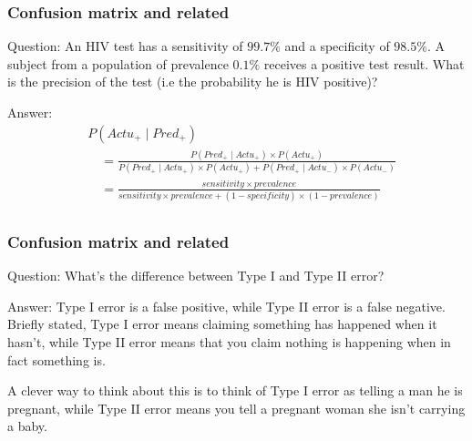 \documentclass[11pt]{beamer}
\begin{document}
\begin{frame}
\frametitle{Confusion matrix and related}
\begin{block}{Question:}
	An HIV test has a sensitivity of $99.7\%$ and a specificity of $98.5\%$. A subject from a population of prevalence $0.1\%$ receives a positive test result. What is the precision of the test (i.e the probability he is HIV positive)?
\end{block}
\begin{block}{Answer:}
	\begin{align*}
	&P(Actu_+\mid Pred_+)\\ &\quad= \frac{P( Pred_+\mid Actu_+)\times P(Actu_+)}{P( Pred_+\mid Actu_+)\times P(Actu_+) + P( Pred_+\mid Actu_-)\times P(Actu_-)}\\
	&\quad=\frac{sensitivity\times prevalence}{sensitivity\times prevalence + (1 - specificity)\times(1-prevalence)}\\
	\end{align*}
\end{block}
\end{frame}

\begin{frame}
\frametitle{Confusion matrix and related}
\begin{block}{Question:}
	What’s the difference between Type I and Type II error?
\end{block}
\begin{block}{Answer:}
	Type I error is a false positive, while Type II error is a false negative. Briefly stated, Type I error means claiming something has happened when it hasn’t, while Type II error means that you claim nothing is happening when in fact something is.
	
	A clever way to think about this is to think of Type I error as telling a man he is pregnant, while Type II error means you tell a pregnant woman she isn’t carrying a baby.
\end{block}
\end{frame}
\end{document}
